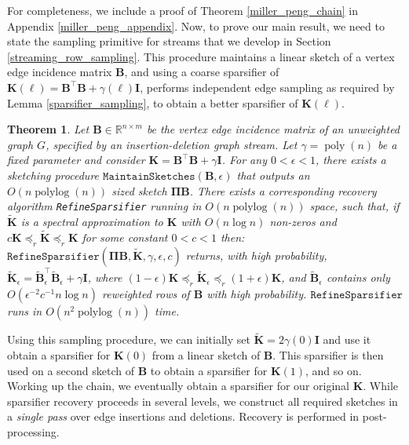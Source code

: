 \documentclass[11pt]{article}
\newcommand{\bv}[1]{\mathbf{#1}}
\newcommand{\maintain}{\texttt{MaintainSketches}}
\newcommand{\plog}{\mathop\mathrm{polylog}}
\newcommand{\poly}{\mathop\mathrm{poly}}
\newtheorem{theorem}{Theorem}
\begin{document}
For completeness, we include a proof of Theorem \ref{miller_peng_chain} in Appendix \ref{miller_peng_appendix}.  Now, to prove our main result, we need to state the sampling primitive for streams that we develop in Section \ref{streaming_row_sampling}. This procedure maintains a linear sketch of a vertex edge incidence matrix $\bv{B}$, and using a coarse sparsifier of $\bv{K}(\ell) = \bv{B}^\top \bv{B} + \gamma(\ell) \bv{I}$, performs independent edge sampling as required by Lemma \ref{sparsifier_sampling}, to obtain a better sparsifier of $\bv{K}(\ell)$.










\begin{theorem}\label{refinement}
Let $\bv{B} \in \mathbb{R}^{n \times m}$ be the vertex edge incidence matrix of an unweighted graph $G$, specified by an insertion-deletion graph stream. Let $\gamma = \poly(n)$ be a fixed parameter and consider $\bv{K} = \bv{B}^\top \bv{B} + \gamma \bv{I}$. For any $0< \epsilon < 1$, there exists a sketching procedure $\maintain(\bv{B},\epsilon)$ that outputs an $O(n \plog (n))$ sized sketch $\bv{\Pi}\bv{B}$. There exists a corresponding recovery algorithm \texttt{RefineSparsifier} running in $O(n \plog (n))$ space, such that,
if $\bv{\tilde K}$ is a spectral approximation to $\bv{K}$ with $O(n \log n)$ non-zeros and $c\bv{K} \preceq_{r} \bv{\tilde K} \preceq_r \bv{K}$ for some constant $0 < c < 1$ then:\\

 $\texttt{RefineSparsifier}(\bv{\Pi}\bv{B}, \bv{\tilde K}, \gamma, \epsilon,c)$ returns, with high probability, $\bv{\tilde K}_\epsilon = \bv{\tilde B}_\epsilon^\top \bv{\tilde B}_\epsilon + \gamma{\bv{I}}$, where $(1-\epsilon)\bv{K} \preceq_{r} \bv{\tilde K}_\epsilon \preceq_r (1+\epsilon)\bv{K}$, and $\bv{\tilde B}_\epsilon$ contains only $O(\epsilon^{-2} c^{-1} n\log n)$ reweighted rows of $\bv{B}$ with high probability.
$\texttt{RefineSparsifier}$ runs in $O(n^2\plog (n))$ time.
\end{theorem}

Using this sampling procedure, we can initially set $\bv{\tilde K} =2\gamma(0)\bv{I}$ and use it obtain a sparsifier for $\bv{K}(0)$ from a linear sketch of $\bv{B}$. This sparsifier is then used on a second sketch of $\bv{B}$ to obtain a sparsifier for $\bv{K}(1)$, and so on. Working up the chain, we eventually obtain a sparsifier for our original $\bv{K}$. While sparsifier recovery proceeds in several levels, we construct all required sketches in a \emph{single pass} over edge insertions and deletions. Recovery is performed in post-processing.
\end{document}
